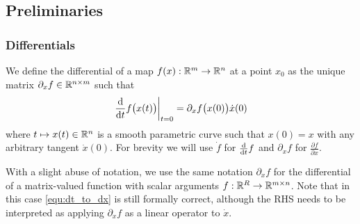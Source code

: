 \documentclass[10pt,twocolumn,twoside]{IEEEtran}
\begin{document}

\subsection{Preliminaries}
\subsubsection{Differentials}
We define the differential of a map $f(x):\mathbb{R}^{m}{}\to\mathbb{R}^{n}{}$ at a point $x_0$ as the unique matrix $\partial_x f \in\mathbb{R}^{n\times m}{}$ such that
\begin{equation}\label{equ:dt_to_dx}
  \left.\frac{\mathrm{d} }{\mathrm{d} t} f\bigl(x(t)\bigr)\right|_{t=0}=\partial_x f\bigl(x(0)\bigr) \dot{x}(0)
\end{equation}
where $t\mapsto x(t)\in\mathbb{R}^{n}{}$ is a smooth parametric curve such that $x(0)=x$ with any arbitrary tangent $\dot{x}(0)$. For brevity we will use $\dot f$ for $\frac{\mathrm{d} }{\mathrm{d} t} f$ and $\partial_x f$ for $\frac{\partial f}{\partial x}$. 

With a slight abuse of notation, we use the same notation $\partial_xf$ for the differential of a matrix-valued function with scalar arguments $f:\mathbb{R}^{R}{}\to\mathbb{R}^{m\times n}{}$.  Note that in this case \eqref{equ:dt_to_dx} is still formally correct, although the RHS needs to be interpreted as applying $\partial_x f$ as a linear operator to $\dot{x}$.
\end{document}
